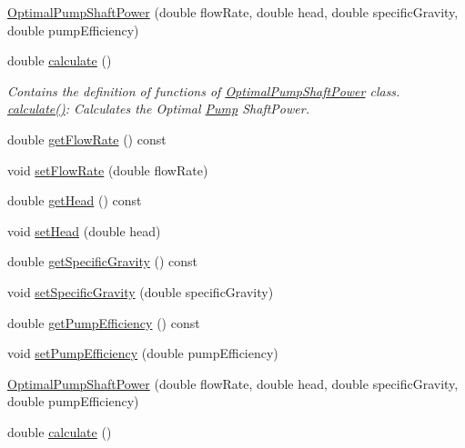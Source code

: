 \begin{DoxyCompactItemize}
\item 
\hyperlink{class_optimal_pump_shaft_power_a6970e2672e4ef7c124a876eda96ee3cc}{Optimal\+Pump\+Shaft\+Power} (double flow\+Rate, double head, double specific\+Gravity, double pump\+Efficiency)
\item 
double \hyperlink{class_optimal_pump_shaft_power_a23ab040eea0a9e0431988bd353076237}{calculate} ()
\begin{DoxyCompactList}\small\item\em Contains the definition of functions of \hyperlink{class_optimal_pump_shaft_power}{Optimal\+Pump\+Shaft\+Power} class. \hyperlink{class_optimal_pump_shaft_power_a23ab040eea0a9e0431988bd353076237}{calculate()}\+: Calculates the Optimal \hyperlink{class_pump}{Pump} Shaft\+Power. \end{DoxyCompactList}\item 
double \hyperlink{class_optimal_pump_shaft_power_a8c1532459a196347f7d5219d4690a490}{get\+Flow\+Rate} () const
\item 
void \hyperlink{class_optimal_pump_shaft_power_a38efdee39db4c3856915f1ab26d44ed2}{set\+Flow\+Rate} (double flow\+Rate)
\item 
double \hyperlink{class_optimal_pump_shaft_power_abb285a8a256c10187113c34db1a4462b}{get\+Head} () const
\item 
void \hyperlink{class_optimal_pump_shaft_power_aa080c62ff92fc70a4e27e7710e490b62}{set\+Head} (double head)
\item 
double \hyperlink{class_optimal_pump_shaft_power_a607d32c56edece639e03007adc1bf325}{get\+Specific\+Gravity} () const
\item 
void \hyperlink{class_optimal_pump_shaft_power_aa565a332e4b144c8eb85fd06c541199e}{set\+Specific\+Gravity} (double specific\+Gravity)
\item 
double \hyperlink{class_optimal_pump_shaft_power_a77b9c639438f9d6008c20948f173a2c4}{get\+Pump\+Efficiency} () const
\item 
void \hyperlink{class_optimal_pump_shaft_power_a2cb2c6b537c7db0bc5071f09c66308d0}{set\+Pump\+Efficiency} (double pump\+Efficiency)
\item 
\hyperlink{class_optimal_pump_shaft_power_a6970e2672e4ef7c124a876eda96ee3cc}{Optimal\+Pump\+Shaft\+Power} (double flow\+Rate, double head, double specific\+Gravity, double pump\+Efficiency)
\item 
double \hyperlink{class_optimal_pump_shaft_power_a23ab040eea0a9e0431988bd353076237}{calculate} ()

\end{DoxyCompactItemize}
